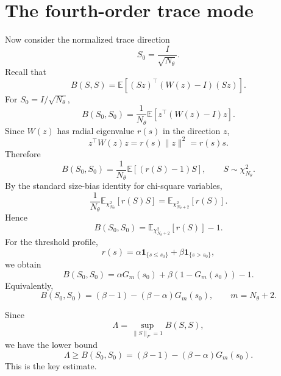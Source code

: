 \documentclass[11pt]{article}
\numberwithin{equation}{section}
\begin{document}
\section{The fourth-order trace mode}

Now consider the normalized trace direction
\begin{equation}
    S_0=\frac{I}{\sqrt{N_\theta}}.
\end{equation}
Recall that
\begin{equation}
    B(S,S)
    =
    \mathbb E
    \left[
    (Sz)^\top (W(z)-I)(Sz)
    \right].
\end{equation}
For $S_0=I/\sqrt{N_\theta}$,
\begin{equation}
    B(S_0,S_0)
    =
    \frac{1}{N_\theta}
    \mathbb E
    [
    z^\top (W(z)-I)z
    ].
\end{equation}
Since $W(z)$ has radial eigenvalue $r(s)$ in the direction $z$,
\begin{equation}
    z^\top W(z)z
    =
    r(s)\|z\|^2
    =
    r(s)s.
\end{equation}
Therefore
\begin{equation}
    B(S_0,S_0)
    =
    \frac{1}{N_\theta}
    \mathbb E[(r(S)-1)S],
    \qquad
    S\sim \chi_{N_\theta}^2.
\end{equation}
By the standard size-bias identity for chi-square variables,
\begin{equation}
    \frac{1}{N_\theta}
    \mathbb E_{\chi_{N_\theta}^2}[r(S)S]
    =
    \mathbb E_{\chi_{N_\theta+2}^2}[r(S)].
\end{equation}
Hence
\begin{equation}
    B(S_0,S_0)
    =
    \mathbb E_{\chi_{N_\theta+2}^2}[r(S)]-1.
\end{equation}
For the threshold profile,
\begin{equation}
    r(s)
    =
    \alpha \mathbf 1_{\{s\le s_0\}}
    +
    \beta \mathbf 1_{\{s>s_0\}},
\end{equation}
we obtain
\begin{equation}
    B(S_0,S_0)
    =
    \alpha G_m(s_0)
    +
    \beta(1-G_m(s_0))
    -1.
\end{equation}
Equivalently,
\begin{equation}
    B(S_0,S_0)
    =
    (\beta-1)
    -
    (\beta-\alpha)G_m(s_0),
    \qquad
    m=N_\theta+2.
\end{equation}

Since
\begin{equation}
    \Lambda
    =
    \sup_{\|S\|_F=1}B(S,S),
\end{equation}
we have the lower bound
\begin{equation}
    \Lambda
    \ge
    B(S_0,S_0)
    =
    (\beta-1)
    -
    (\beta-\alpha)G_m(s_0).
\end{equation}
This is the key estimate.
\end{document}
